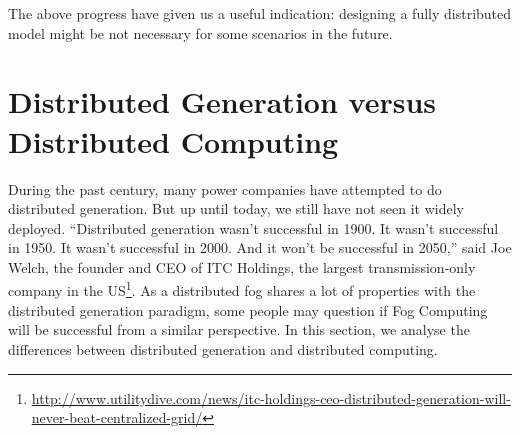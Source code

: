 The above progress have given us a useful indication: designing a fully distributed model might be not necessary for some scenarios in the future. 

\section{Distributed Generation versus Distributed Computing}\label{sec-dg-vs-dc}

During the past century, many power companies have attempted to do distributed generation. But up until today, we still have not seen it widely deployed. ``Distributed generation wasn't successful in 1900. It wasn't successful in 1950. It wasn't successful in 2000. And it won't be successful in 2050,'' said Joe Welch, the founder and CEO of ITC Holdings, the largest transmission-only company in the US\footnote{\url{http://www.utilitydive.com/news/itc-holdings-ceo-distributed-generation-will-never-beat-centralized-grid/}}. As a distributed fog shares a lot of properties with the distributed generation paradigm, some people may question if Fog Computing will be successful from a similar perspective. In this section, we analyse the differences between distributed generation and distributed computing. 

